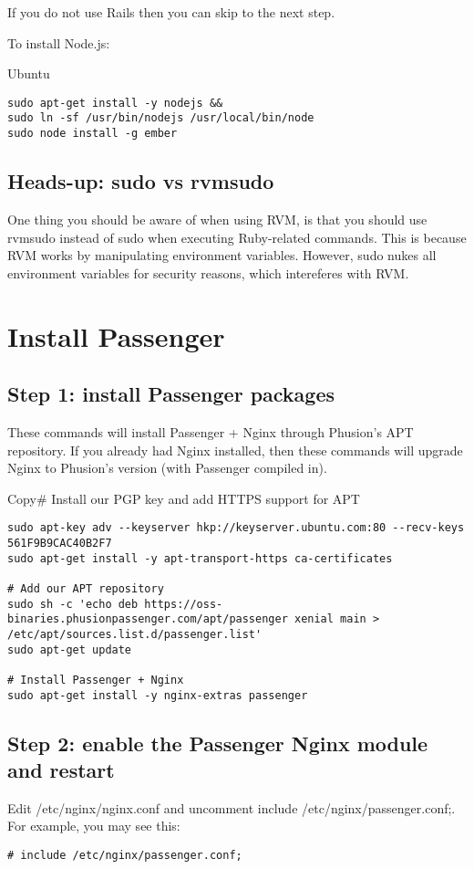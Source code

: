 \documentclass[11pt]{article}
\begin{document}
If you do not use Rails then you can skip to the next step.

To install Node.js:

Ubuntu

\begin{verbatim}
sudo apt-get install -y nodejs &&
sudo ln -sf /usr/bin/nodejs /usr/local/bin/node
sudo node install -g ember
\end{verbatim}

\subsection{Heads-up: sudo vs rvmsudo}
\label{sec:org389d0e1}

One thing you should be aware of when using RVM, is that you should use rvmsudo instead of sudo when executing Ruby-related commands. This is because RVM works by manipulating environment variables. However, sudo nukes all environment variables for security reasons, which intereferes with RVM.

\section{Install Passenger}
\label{sec:org553a279}
\subsection{Step 1: install Passenger packages}
\label{sec:orgbb142bf}

These commands will install Passenger + Nginx through Phusion's APT repository. If you already had Nginx installed, then these commands will upgrade Nginx to Phusion's version (with Passenger compiled in).

Copy\# Install our PGP key and add HTTPS support for APT
\begin{verbatim}
sudo apt-key adv --keyserver hkp://keyserver.ubuntu.com:80 --recv-keys 561F9B9CAC40B2F7
sudo apt-get install -y apt-transport-https ca-certificates

# Add our APT repository
sudo sh -c 'echo deb https://oss-binaries.phusionpassenger.com/apt/passenger xenial main > /etc/apt/sources.list.d/passenger.list'
sudo apt-get update

# Install Passenger + Nginx
sudo apt-get install -y nginx-extras passenger
\end{verbatim}
\subsection{Step 2: enable the Passenger Nginx module and restart}
\label{sec:orge849306}
Edit /etc/nginx/nginx.conf and uncomment include /etc/nginx/passenger.conf;. For example, you may see this:
\begin{verbatim}
# include /etc/nginx/passenger.conf;
\end{verbatim}
\end{document}
